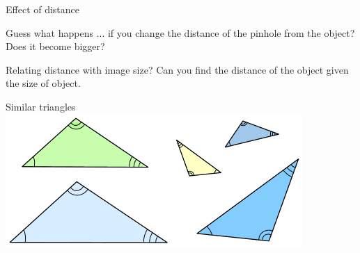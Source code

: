 \begin{frame}[fragile]{Effect of distance}
  
\end{frame}

\begin{frame}{Guess what happens}
  ... if you change the distance of the pinhole from the object?\\
  \pause
  {\color{red} Does it become bigger?}
\end{frame}

\begin{frame}{Relating distance with image size?}
  Can you find the distance of the object given the size of object.
\end{frame}

\begin{frame}{Similar triangles}
  \includegraphics[width=\textwidth]{media/tri-similar1.png}
\end{frame}

